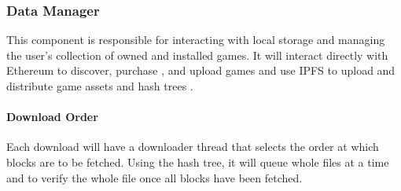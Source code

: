 \subsubsection{Data Manager}\label{subsubsec:data-manager}

This component is responsible for interacting with local storage and managing the user's collection of owned and installed games.
It will interact directly with Ethereum to discover, purchase , and upload   games and use IPFS to upload and distribute game assets  and hash trees .

\paragraph*{Download Order} Each download will have a downloader thread that selects the order at which blocks are to be fetched. Using the hash tree, it will queue whole files at a time and to verify the whole file once all blocks have been fetched.



